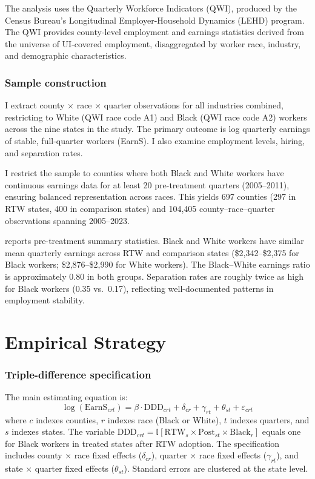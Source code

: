 \documentclass[12pt]{article}
\newcommand{\ind}{\mathbb{I}}
\begin{document}
The analysis uses the Quarterly Workforce Indicators (QWI), produced by the Census Bureau's Longitudinal Employer-Household Dynamics (LEHD) program. The QWI provides county-level employment and earnings statistics derived from the universe of UI-covered employment, disaggregated by worker race, industry, and demographic characteristics.

\subsubsection*{Sample construction} I extract county $\times$ race $\times$ quarter observations for all industries combined, restricting to White (QWI race code A1) and Black (QWI race code A2) workers across the nine states in the study. The primary outcome is log quarterly earnings of stable, full-quarter workers (EarnS). I also examine employment levels, hiring, and separation rates.

I restrict the sample to counties where both Black and White workers have continuous earnings data for at least 20 pre-treatment quarters (2005--2011), ensuring balanced representation across races. This yields 697 counties (297 in RTW states, 400 in comparison states) and 104,405 county--race--quarter observations spanning 2005--2023.

 reports pre-treatment summary statistics. Black and White workers have similar mean quarterly earnings across RTW and comparison states (\$2,342--\$2,375 for Black workers; \$2,876--\$2,990 for White workers). The Black--White earnings ratio is approximately 0.80 in both groups. Separation rates are roughly twice as high for Black workers (0.35 vs.~0.17), reflecting well-documented patterns in employment stability.




\section{Empirical Strategy}
\label{sec:empirical}

\subsubsection*{Triple-difference specification} The main estimating equation is:
\begin{equation}
\label{eq:ddd}
\log(\text{EarnS}_{crt}) = \beta \cdot \text{DDD}_{crt} + \delta_{cr} + \gamma_{rt} + \theta_{st} + \varepsilon_{crt}
\end{equation}
where $c$ indexes counties, $r$ indexes race (Black or White), $t$ indexes quarters, and $s$ indexes states. The variable $\text{DDD}_{crt} = \ind[\text{RTW}_s \times \text{Post}_{st} \times \text{Black}_r]$ equals one for Black workers in treated states after RTW adoption. The specification includes county $\times$ race fixed effects ($\delta_{cr}$), quarter $\times$ race fixed effects ($\gamma_{rt}$), and state $\times$ quarter fixed effects ($\theta_{st}$). Standard errors are clustered at the state level.
\end{document}
